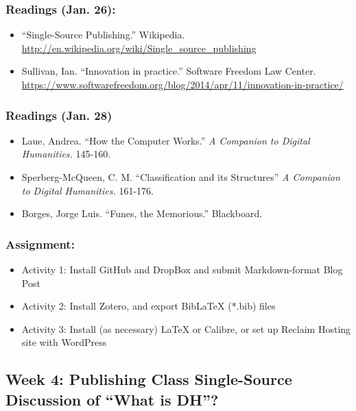 \documentclass[]{article}
\begin{document}
\subsubsection{Readings (Jan. 26):}\label{readings-jan.-26}

\begin{itemize}
\itemsep1pt\parskip0pt
\item
  ``Single-Source Publishing.'' Wikipedia.
  \url{http://en.wikipedia.org/wiki/Single_source_publishing}
\item
  Sullivan, Ian. ``Innovation in practice.'' Software Freedom Law
  Center.
  \url{https://www.softwarefreedom.org/blog/2014/apr/11/innovation-in-practice/}
\end{itemize}

\subsubsection{Readings (Jan. 28)}\label{readings-jan.-28}

\begin{itemize}
\itemsep1pt\parskip0pt
\item
  Laue, Andrea. ``How the Computer Works.'' \emph{A Companion to Digital
  Humanities.} 145-160.
\item
  Sperberg-McQueen, C. M. ``Classification and its Structures'' \emph{A
  Companion to Digital Humanities.} 161-176.
\item
  Borges, Jorge Luis. ``Funes, the Memorious.'' Blackboard.
\end{itemize}

\subsubsection{Assignment:}\label{assignment-2}

\begin{itemize}
\itemsep1pt\parskip0pt
\item
  Activity 1: Install GitHub and DropBox and submit Markdown-format Blog
  Post
\item
  Activity 2: Install Zotero, and export BibLaTeX (*.bib) files
\item
  Activity 3: Install (as necessary) LaTeX or Calibre, or set up Reclaim
  Hosting site with WordPress
\end{itemize}

\subsection{Week 4: Publishing Class Single-Source Discussion of ``What
is
DH''?}\label{week-4-publishing-class-single-source-discussion-of-what-is-dh}
\end{document}
